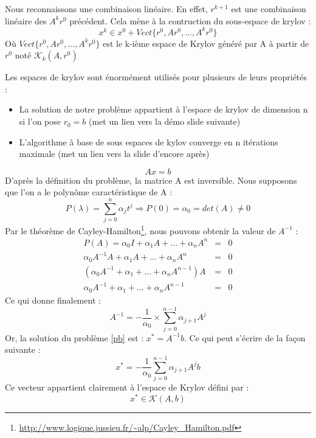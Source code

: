 \documentclass[12pt]{beamer}
\begin{document}
\begin{frame}
    Nous reconnaissons une combinaison linéaire. En effet,  $r^{k+1}$ est une combinaison linéaire des $A^kr^0$ précédent. Cela mène à la contruction du sous-espace de krylov : 
    \begin{equation}
        x^k \in x^0 + Vect\{r^0, Ar^0, ..., A^kr^0\}
    \end{equation}
    Où $Vect\{r^0, Ar^0, ..., A^kr^0\}$ est le k-ième espace de Krylov généré par A à partir de $r^0$ noté $\mathcal{K}_k(A, r^0)$		
\end{frame}

\begin{frame}
     Les espaces de krylov sont énormément utilisés pour plusieurs de leurs propriétés :
     \begin{itemize}
        \item La solution de notre problème appartient à l'espace de krylov de dimension n si l'on pose $r_0 = b$ (met un lien vers la démo slide suivante)
        \item L'algorithme à base de sous espaces de kylov converge en n itérations maximale  (met un lien vers la slide d'encore après)
     \end{itemize}
\end{frame}
\begin{frame}
\begin{equation}
Ax = b \label{pb}
\end{equation}
D'après la définition du problème, la matrice A est inversible. Nous supposons que l'on a le polynôme caractéristique de A :
\begin{equation}
P(\lambda) = \sum_{j = 0}^{n} \alpha_j t^j \Rightarrow P(0) = \alpha_0 = det(A) \neq 0
\end{equation}
Par le théorème de Cayley-Hamilton\footnote{\url{http://www.logique.jussieu.fr/~alp/Cayley_Hamilton.pdf}}, nous pouvons obtenir la valeur de $A^{-1}$ :
\begin{eqnarray}
P(A) = \alpha_0 I + \alpha_1 A + ... + \alpha_n A^n &=& 0 \\
\alpha_0 A^{-1}A + \alpha_1 A + ... + \alpha_n A^n &=& 0 \\
(\alpha_0 A^{-1} + \alpha_1  + ... + \alpha_n A^{n - 1})A &=& 0 \\
\alpha_0 A^{-1} + \alpha_1  + ... + \alpha_n A^{n - 1} &=& 0
\end{eqnarray}
Ce qui donne finalement :
\begin{equation}
 A^{-1} = - \frac{1}{\alpha_0} \times \sum_{j=0}^{n-1} \alpha_{j+1} A^j
\end{equation}
Or, la solution du problème \ref{pb} est : $x^* = A^{-1}b$. Ce qui peut s'écrire de la façon suivante : 
\begin{equation}
x^* = - \frac{1}{\alpha_0} \sum_{j=0}^{n-1} \alpha_{j+1} A^j b
\end{equation}
Ce vecteur appartient clairement à l'espace de Krylov défini par : 
\begin{equation}
x^* \in \mathcal{K}(A, b)
\end{equation}
\end{frame}
\end{document}
